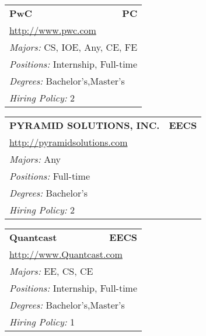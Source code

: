 \documentclass[twoside]{article}
\begin{document}
\begin{center}
\begin{multicols}{3}
\begin{FlushLeft}
\begin{minipage}{.9\columnwidth}
\end{minipage}
 
\begin{minipage}{.9\columnwidth}\begin{tabularx}{.95\columnwidth}{Xr}
                 {\Large\bf PwC} & {\Large\bf PC}\\
    \multicolumn{2}{p{.95\columnwidth}}{\url{http://www.pwc.com}}\\
    \multicolumn{2}{p{.95\columnwidth}}{\emph{Majors:} CS, IOE, Any, CE, FE}\\
    \multicolumn{2}{p{.95\columnwidth}}{\emph{Positions:} Internship, Full-time}\\
    \multicolumn{2}{p{.95\columnwidth}}{\emph{Degrees:} Bachelor's,Master's}\\
    \multicolumn{2}{p{.95\columnwidth}}{\emph{Hiring Policy:} 2}\\
    \end{tabularx}
    
\end{minipage}
 
\begin{minipage}{.9\columnwidth}\begin{tabularx}{.95\columnwidth}{Xr}
                 {\Large\bf PYRAMID SOLUTIONS, INC.} & {\Large\bf EECS}\\
    \multicolumn{2}{p{.95\columnwidth}}{\url{http://pyramidsolutions.com}}\\
    \multicolumn{2}{p{.95\columnwidth}}{\emph{Majors:} Any}\\
    \multicolumn{2}{p{.95\columnwidth}}{\emph{Positions:} Full-time}\\
    \multicolumn{2}{p{.95\columnwidth}}{\emph{Degrees:} Bachelor's}\\
    \multicolumn{2}{p{.95\columnwidth}}{\emph{Hiring Policy:} 2}\\
    \end{tabularx}
    
\end{minipage}
 
\begin{minipage}{.9\columnwidth}\begin{tabularx}{.95\columnwidth}{Xr}
                 {\Large\bf Quantcast} & {\Large\bf EECS}\\
    \multicolumn{2}{p{.95\columnwidth}}{\url{http://www.Quantcast.com}}\\
    \multicolumn{2}{p{.95\columnwidth}}{\emph{Majors:} EE, CS, CE}\\
    \multicolumn{2}{p{.95\columnwidth}}{\emph{Positions:} Internship, Full-time}\\
    \multicolumn{2}{p{.95\columnwidth}}{\emph{Degrees:} Bachelor's,Master's}\\
    \multicolumn{2}{p{.95\columnwidth}}{\emph{Hiring Policy:} 1}\\
    \end{tabularx}
    

\end{minipage}
\end{FlushLeft}
\end{multicols}
\end{center}
\end{document}
